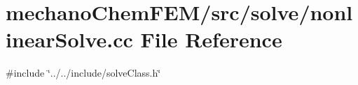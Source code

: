 \section{mechano\+Chem\+F\+E\+M/src/solve/nonlinear\+Solve.cc File Reference}
\label{nonlinear_solve_8cc}
{\ttfamily \#include \char`\"{}../../include/solve\+Class.\+h\char`\"{}}\newline

